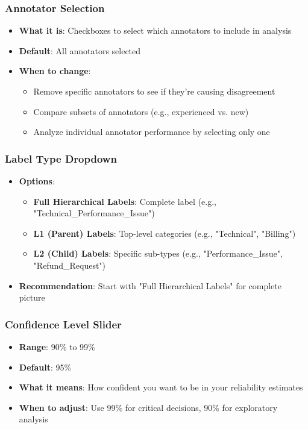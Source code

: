 \documentclass[11pt]{article}
\begin{document}
\subsubsection{Annotator Selection}
\begin{itemize}
\item \textbf{What it is}: Checkboxes to select which annotators to include in analysis
\item \textbf{Default}: All annotators selected
\item \textbf{When to change}: 
\begin{itemize}
\item Remove specific annotators to see if they're causing disagreement
\item Compare subsets of annotators (e.g., experienced vs. new)
\item Analyze individual annotator performance by selecting only one
\end{itemize}
\end{itemize}

\subsubsection{Label Type Dropdown}
\begin{itemize}
\item \textbf{Options}:
\begin{itemize}
\item \textbf{Full Hierarchical Labels}: Complete label (e.g., "Technical\_Performance\_Issue")
\item \textbf{L1 (Parent) Labels}: Top-level categories (e.g., "Technical", "Billing")
\item \textbf{L2 (Child) Labels}: Specific sub-types (e.g., "Performance\_Issue", "Refund\_Request")
\end{itemize}
\item \textbf{Recommendation}: Start with "Full Hierarchical Labels" for complete picture
\end{itemize}

\subsubsection{Confidence Level Slider}
\begin{itemize}
\item \textbf{Range}: 90\% to 99\%
\item \textbf{Default}: 95\%
\item \textbf{What it means}: How confident you want to be in your reliability estimates
\item \textbf{When to adjust}: Use 99\% for critical decisions, 90\% for exploratory analysis
\end{itemize}
\end{document}

